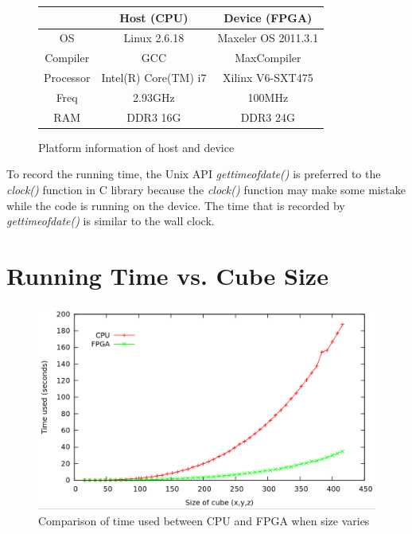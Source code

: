 \begin{figure}
\begin{centering}
\begin{tabular}{|c|c|c|}
\hline
 & Host (CPU) & Device (FPGA)\tabularnewline
\hline
\hline
OS & Linux 2.6.18 & Maxeler OS 2011.3.1\tabularnewline
\hline
Compiler & GCC & MaxCompiler\tabularnewline
\hline
Processor & Intel(R) Core(TM) i7 & Xilinx V6-SXT475\tabularnewline
\hline
Freq & 2.93GHz & 100MHz\tabularnewline
\hline
RAM & DDR3 16G & DDR3 24G\tabularnewline
\hline
\end{tabular}
\par\end{centering}

\caption{\label{fig:Platform-information-of}Platform information of host and
device}


\end{figure}

To record the running time, the Unix API \emph{gettimeofdate()} is preferred
to the \emph{clock()} function in C library because the
\emph{clock()} function may make some mistake while the code is running on
the device. The time that is recorded by \emph{gettimeofdate()} is similar
to the wall clock.

\label{ssub:Platform information}


\section{Running Time vs. Cube Size}
\label{sub:Running Time vs. Cube Si}


\begin{figure}
  \centering
  \includegraphics[scale=0.3]{img/t10size16to256.png}
  \caption{Comparison of time used between CPU and FPGA when size varies}
  \label{fig:comparison_1}
\end{figure}

